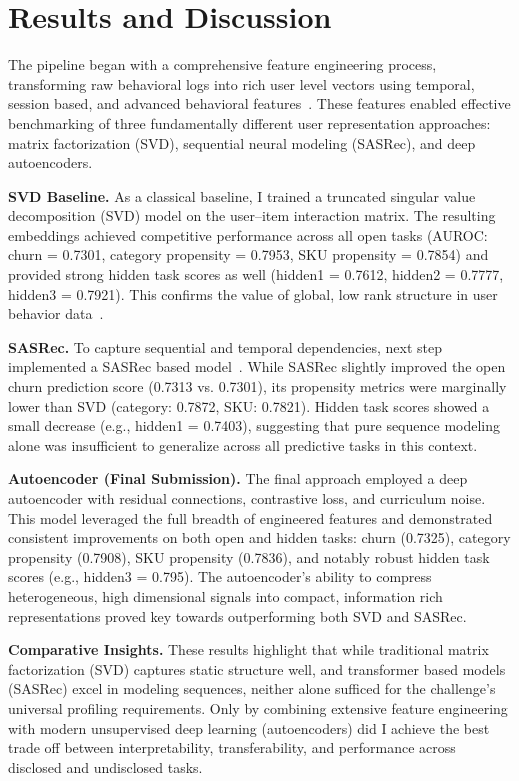 \documentclass[sigconf]{acmart}
\begin{document}
\section{Results and Discussion}
The pipeline began with a comprehensive feature engineering process, transforming raw behavioral logs into rich user level vectors using temporal, session based, and advanced behavioral features~\cite{Quadrana2018, Christoffel2022}. These features enabled effective benchmarking of three fundamentally different user representation approaches: matrix factorization (SVD), sequential neural modeling (SASRec), and deep autoencoders.

\textbf{SVD Baseline.}
As a classical baseline, I trained a truncated singular value decomposition (SVD) model on the user–item interaction matrix. The resulting embeddings achieved competitive performance across all open tasks (AUROC: churn = 0.7301, category propensity = 0.7953, SKU propensity = 0.7854) and provided strong hidden task scores as well (hidden1 = 0.7612, hidden2 = 0.7777, hidden3 = 0.7921). This confirms the value of global, low rank structure in user behavior data~\cite{Koren2009}.

\textbf{SASRec.}
To capture sequential and temporal dependencies,  next step implemented a SASRec based model~\cite{Kang2018}. While SASRec slightly improved the open churn prediction score (0.7313 vs. 0.7301), its propensity metrics were marginally lower than SVD (category: 0.7872, SKU: 0.7821). Hidden task scores showed a small decrease (e.g., hidden1 = 0.7403), suggesting that pure sequence modeling alone was insufficient to generalize across all predictive tasks in this context.

\textbf{Autoencoder (Final Submission).}
The final approach employed a deep autoencoder with residual connections, contrastive loss, and curriculum noise. This model leveraged the full breadth of engineered features and demonstrated consistent improvements on both open and hidden tasks: churn (0.7325), category propensity (0.7908), SKU propensity (0.7836), and notably robust hidden task scores (e.g., hidden3 = 0.795). The autoencoder’s ability to compress heterogeneous, high dimensional signals into compact, information rich representations proved key towards outperforming both SVD and SASRec.

\textbf{Comparative Insights.}
These results highlight that while traditional matrix factorization (SVD) captures static structure well, and transformer based models (SASRec) excel in modeling sequences, neither alone sufficed for the challenge’s universal profiling requirements. Only by combining extensive feature engineering with modern unsupervised deep learning (autoencoders) did I achieve the best trade off between interpretability, transferability, and performance across disclosed and undisclosed tasks.
\end{document}
